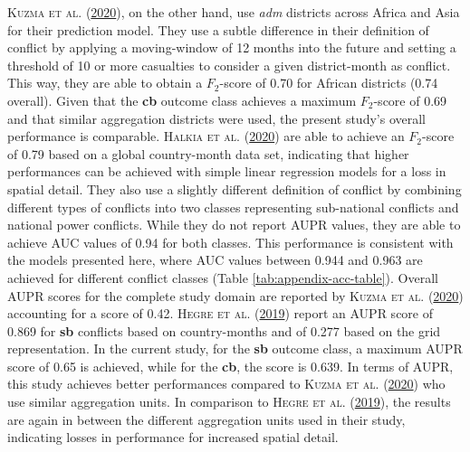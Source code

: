 \documentclass[a4paper,11pt]{article}
\begin{document}
\textsc{\textnormal{Kuzma} \textnormal{et al.}} \textsc{(\textnormal{\protect\hyperlink{ref-kuzma2020}{2020}})}, on the other hand, use \emph{adm} districts across Africa and Asia for
their prediction model. They use a subtle difference in their definition of
conflict by applying a moving-window of 12 months into the future and setting a
threshold of 10 or more casualties to consider a given district-month as conflict.
This way, they are able to obtain a \(F_2\)-score of 0.70 for African
districts (0.74 overall). Given that the \textbf{cb} outcome class achieves a maximum
\(F_2\)-score of 0.69 and that similar aggregation districts were used, the present
study's overall performance is comparable. \textsc{\textnormal{Halkia} \textnormal{et al.}} \textsc{(\textnormal{\protect\hyperlink{ref-halkia2020a}{2020}})} are able to achieve
an \(F_2\)-score of 0.79 based on a global country-month data set, indicating
that higher performances can be achieved with simple linear regression models
for a loss in spatial detail. They also use a slightly different definition of
conflict by combining different types of conflicts into two classes representing
sub-national conflicts and national power conflicts. While they do not report
AUPR values, they are able to achieve AUC values of 0.94 for both classes. This
performance is consistent with the models presented here, where AUC values
between 0.944 and 0.963 are achieved for different conflict classes (Table \ref{tab:appendix-acc-table}).
Overall AUPR scores for the complete study domain are reported by \textsc{\textnormal{Kuzma} \textnormal{et al.}} \textsc{(\textnormal{\protect\hyperlink{ref-kuzma2020}{2020}})}
accounting for a score of 0.42. \textsc{\textnormal{Hegre} \textnormal{et al.}} \textsc{(\textnormal{\protect\hyperlink{ref-hegre2019}{2019}})} report an AUPR score of 0.869
for \textbf{sb} conflicts based on country-months and of 0.277 based on the grid
representation. In the current study, for the \textbf{sb} outcome class, a maximum
AUPR score of 0.65 is achieved, while for the \textbf{cb}, the score is 0.639. In terms
of AUPR, this study achieves better performances compared to \textsc{\textnormal{Kuzma} \textnormal{et al.}} \textsc{(\textnormal{\protect\hyperlink{ref-kuzma2020}{2020}})} who use
similar aggregation units. In comparison to \textsc{\textnormal{Hegre} \textnormal{et al.}} \textsc{(\textnormal{\protect\hyperlink{ref-hegre2019}{2019}})}, the results are again in
between the different aggregation units used in their study, indicating losses
in performance for increased spatial detail.
\end{document}
